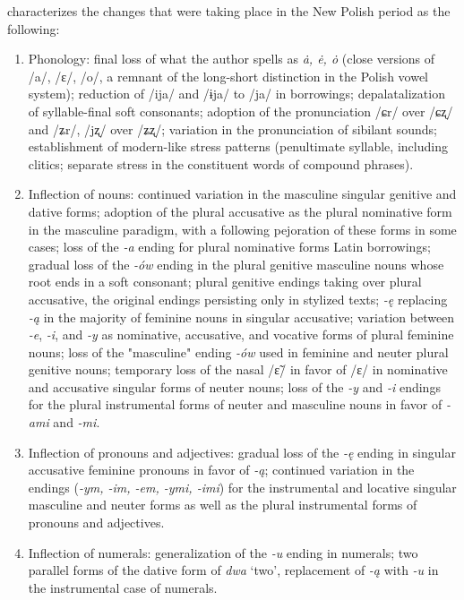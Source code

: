 \citet{klemensiewicz_76} characterizes the changes that were taking place in the New Polish period as the following:
\begin{enumerate}
    \item Phonology: final loss of what the author spells as \textit{ȧ, ė, ȯ} (close versions of /a/, /ɛ/, /o/, a remnant of the long-short distinction in the Polish vowel system); reduction of /ija/ and /ɨja/ to /ja/ in borrowings; depalatalization of syllable-final soft consonants; adoption of the pronunciation /ɕr/ over /ɕʐ/ and /ʑr/, /jʐ/ over /ʑʐ/; variation in the pronunciation of sibilant sounds; establishment of modern-like stress patterns (penultimate syllable, including clitics; separate stress in the constituent words of compound phrases). 
    
    \item Inflection of nouns: continued variation in the masculine singular genitive and dative forms; adoption of the plural accusative as the plural nominative form in the masculine paradigm, with a following pejoration of these forms in some cases; loss of the \textit{-a} ending for plural nominative forms Latin borrowings; gradual loss of the \textit{-ów} ending in the plural genitive masculine nouns whose root ends in a soft consonant; plural genitive endings taking over plural accusative, the original endings persisting only in stylized texts; \textit{-ę} replacing \textit{-ą} in the majority of feminine nouns in singular accusative; variation between \textit{-e}, \textit{-i}, and \textit{-y} as nominative, accusative, and vocative forms of plural feminine nouns; loss of the "masculine" ending \textit{-ów} used in feminine and neuter plural genitive nouns; temporary loss of the nasal /ɛ̃/ in favor of /ɛ/ in nominative and accusative singular forms of neuter nouns; loss of the \textit{-y} and \textit{-i} endings for the plural instrumental forms of neuter and masculine nouns in favor of \textit{-ami} and \textit{-mi}.
    
    \item Inflection of pronouns and adjectives: gradual loss of the \textit{-ę} ending in singular accusative feminine pronouns in favor of \textit{-ą}; continued variation in the endings (\textit{-ym, -im, -em, -ymi, -imi}) for the instrumental and locative singular masculine and neuter forms as well as the plural instrumental forms of pronouns and adjectives.
    
    \item Inflection of numerals: generalization of the \textit{-u} ending in numerals; two parallel forms of the dative form of \textit{dwa} `two', replacement of \textit{-ą} with \textit{-u} in the instrumental case of numerals.
            

\end{enumerate}
